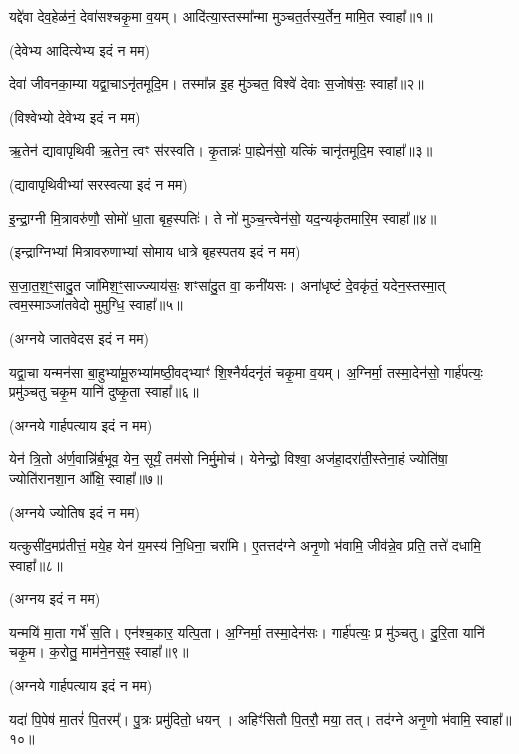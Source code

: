 
\newcommand{\idam}{इदं न मम}


यद्दे॑वा देव॒हेळ॑नं॒ देवा॑सश्चकृ॒मा व॒यम्। 
आदि॑त्या॒स्तस्मा᳚न्मा मुञ्चत॒र्तस्य॒र्तेन॒ मामि॒त स्वाहा᳚॥१॥

(देवेभ्य आदित्येभ्य \idam)

देवा॑ जीवनका॒म्या यद्वा॒चाऽनृ॑त\-मूदि॒म। 
तस्मा᳚न्न इ॒ह मु॑ञ्चत॒ विश्वे॑ देवाः स॒जोष॑सः॒ स्वाहा᳚॥२॥

(विश्वेभ्यो देवेभ्य \idam)


ऋ॒तेन॑ द्यावापृथिवी ऋ॒तेन॒ त्वꣳ स॑रस्वति। 
कृ॒तान्नः॑ पा॒ह्येन॑सो॒ यत्किं चानृ॑त\-मूदि॒म स्वाहा᳚॥३॥

(द्यावापृथिवीभ्यां सरस्वत्या \idam)

इ॒न्द्रा॒ग्नी मि॒त्रावरु॑णौ॒ सोमो॑ धा॒ता बृह॒स्पतिः॑। 
ते नो॑ मुञ्च॒न्त्वेन॑सो॒ यद॒न्यकृ॑तमारि॒म स्वाहा᳚॥४॥

(इन्द्राग्निभ्यां मित्रावरुणाभ्यां सोमाय धात्रे बृहस्पतय \idam)


स॒जा॒त॒श॒ꣳ॒सादु॒त जा॑मिश॒ꣳ॒साज्ज्याय॑सः॒ शꣳसा॑दु॒त वा॒ कनी॑यसः। 
अना॑धृष्टं दे॒वकृ॑तं॒ यदेन॒स्तस्मा॒त् त्वम॒स्माञ्जा॑तवेदो मुमुग्धि॒ स्वाहा᳚॥५॥

(अग्नये जातवेदस \idam)

यद्वा॒चा यन्मन॑सा बा॒हुभ्या॑मू॒रुभ्या॑मष्ठी॒वद्भ्याꣳ॑ शि॒श्नैर्यदनृ॑तं चकृ॒मा व॒यम्। 
अ॒ग्निर्मा॒ तस्मा॒देन॑सो॒ गार्\mbox{}ह॑पत्यः॒ प्रमु॑ञ्चतु चकृ॒म यानि॑ दुष्कृ॒ता स्वाहा᳚॥६॥

(अग्नये गार्हपत्याय \idam)


येन॑ त्रि॒तो अ॑र्ण॒वान्नि॑र्ब॒भूव॒ येन॒ सूर्यं॒ तम॑सो निर्मु॒मोच॑। 
येनेन्द्रो॒ विश्वा॒ अज॑हा॒दरा॑ती॒स्तेना॒हं ज्योति॑षा॒ ज्योति॑रानशा॒न आ᳚क्षि॒ स्वाहा᳚॥७॥

(अग्नये ज्योतिष \idam)

यत्कुसी॑द॒मप्र॑तीत्तं॒ मये॒ह येन॑ य॒मस्य॑ नि॒धिना॒ चरा॑मि। 
ए॒तत्तद॑ग्ने अनृ॒णो भ॑वामि॒ जीव॑न्ने॒व प्रति॒ तत्ते॑ दधामि॒ स्वाहा᳚॥८॥

(अग्नय \idam)


यन्मयि॑ मा॒ता गर्भे॑ स॒ति। एन॑श्च॒कार॒ यत्पि॒ता।
अ॒ग्निर्मा॒ तस्मा॒देन॑सः। गार्\mbox{}ह॑पत्यः॒ प्र मु॑ञ्चतु। 
दु॒रि॒ता यानि॑ चकृ॒म। क॒रोतु॒ माम॑ने॒नस॒ꣴ॒ स्वाहा᳚॥९॥

(अग्नये गार्हपत्याय \idam)

यदा॑ पि॒पेष॑ मा॒तरं॑ पि॒तरम्᳚।
पु॒त्रः प्रमु॑दितो॒ धयन्।
अहिꣳ॑सितौ पि॒तरौ॒ मया॒ तत्।
तद॑ग्ने अनृ॒णो भ॑वामि॒ स्वाहा᳚॥१०॥

